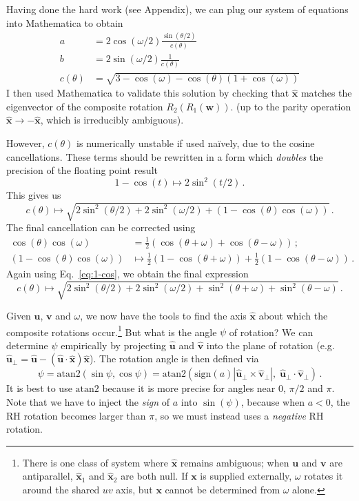 \documentclass[12pt, nofootinbib, notitlepage]{revtex4-1}
\renewcommand{\vec}[1]{\boldsymbol{#1}}
\newcommand{\vecN}[1]{\vec{\hat{#1}}}
\newcommand{\ds}{^{}}
\newcommand{\abs}[1]{|#1|}
\newcommand{\ang}{\psi}
\newcommand{\vict}{\vec{w}}
\newcommand{\ax}{\vecN{x}}
\begin{document}
Having done the hard work (see Appendix),
we can plug our system of equations into Mathematica to obtain
\begin{align}
	a & = 2\cos(\omega/2)\frac{\sin(\theta/2)}{c(\theta)}\\
	b & = 2\sin(\omega/2)\frac{1}{c(\theta)}\\
	c(\theta) & = \sqrt{3 - \cos(\omega) - \cos(\theta)(1+\cos(\omega))}
\end{align}
I then used Mathematica to validate this solution by checking that 
$\ax$ matches the eigenvector of the composite rotation $R_2\ds(R_1\ds(\vict))$.
(up to the parity operation $\ax \to -\ax$, which is irreducibly ambiguous).

However, $c(\theta)$ is numerically unstable if used na\"ively, 
due to the cosine cancellations. These terms should be rewritten 
in a form which \emph{doubles} the precision of the floating point result
\begin{equation}\label{eq:1-cos}
	1-\cos(t) \mapsto 2\sin^2(t/2)\,.
\end{equation}
This gives us
\begin{equation}
	c(\theta)\mapsto
	\sqrt{2\sin^2(\theta/2) + 2\sin^2(\omega/2) + (1 - \cos(\theta)\cos(\omega))}\,.
\end{equation}
The final cancellation can be corrected using
\begin{align}
	\cos(\theta)\cos(\omega) 
		& = \frac{1}{2}(\cos(\theta+\omega) + \cos(\theta-\omega))\,;\\
	(1 - \cos(\theta)\cos(\omega)) 
		&\mapsto \frac{1}{2}(1-\cos(\theta+\omega))
		 + \frac{1}{2}(1-\cos(\theta-\omega))\,.
\end{align}
Again using Eq.~\ref{eq:1-cos}, we obtain the final expression
\begin{equation}
	c(\theta)\mapsto
	\sqrt{2\sin^2(\theta/2) + 2\sin^2(\omega/2)	
	+ \sin^2(\theta+\omega) 
	+ \sin^2(\theta-\omega)}\,.
\end{equation}

Given $\vec{u}$, $\vec{v}$ and $\omega$, we now have the tools to find the axis $\ax$
about which the composite rotations occur.\footnote
{\nobreak
	There is one class of system where $\ax$ remains ambiguous;
	when $\vec{u}$ and $\vec{v}$ are antiparallel, 
	$\ax_1\ds$ and $\ax_2\ds$ are both null.
	If $\vec{x}$ is supplied externally, 
	$\omega$ rotates it around the shared $uv$ axis,
	but $\vec{x}$ cannot be determined from $\omega$ alone.
}
But what is the angle $\ang$ of rotation?
We can determine $\psi$ empirically by projecting 
$\vecN{u}$ and $\vecN{v}$ into the plane of rotation (e.g. 
$\vecN{u}_\bot\ds = \vecN{u} - (\vecN{u}\cdot\vecN{x}) \vecN{x}$).
The rotation angle is then defined via
\begin{equation}
	\psi = \text{atan2}(\sin\psi, \cos\psi)
		= \text{atan2}\left(\text{sign}(a)\abs{\vecN{u}_\bot\ds \times \vecN{v}_\bot\ds},\; 
		\vecN{u}_\bot\ds \cdot \vecN{v}_\bot\ds\right)\,.
\end{equation}
It is best to use $\text{atan2}$ because it is more precise
for angles near $0$, $\pi/2$ and $\pi$. Note that we have to 
inject the \emph{sign} of $a$ into $\sin(\psi)$, 
because when $a<0$, the RH rotation becomes larger than 
$\pi$, so we must instead uses a \emph{negative} RH rotation.
\end{document}
